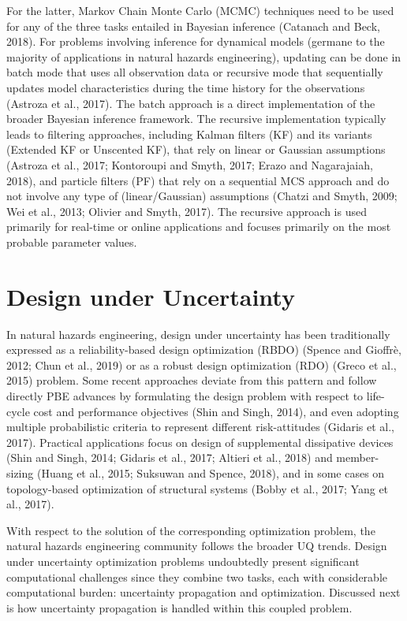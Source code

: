For the latter, Markov Chain Monte Carlo (MCMC) techniques need to be used for any of the three tasks entailed in Bayesian inference (Catanach and Beck, 2018). For problems involving inference for dynamical models (germane to the majority of applications in natural hazards engineering), updating can be done in batch mode that uses all observation data or recursive mode that sequentially updates model characteristics during the time history for the observations (Astroza et al., 2017). The batch approach is a direct implementation of the broader Bayesian inference framework. The recursive implementation typically leads to filtering approaches, including Kalman filters (KF) and its variants (Extended KF or Unscented KF), that rely on linear or Gaussian assumptions (Astroza et al., 2017; Kontoroupi and Smyth, 2017; Erazo and Nagarajaiah, 2018), and particle filters (PF) that rely on a sequential MCS approach and do not involve any type of (linear/Gaussian) assumptions (Chatzi and Smyth, 2009; Wei et al., 2013; Olivier and Smyth, 2017). The recursive approach is used primarily for real-time or online applications and focuses primarily on the most probable parameter values. 

\section{Design under Uncertainty}
\label{sec:uq_design}

In natural hazards engineering, design under uncertainty has been traditionally expressed as a reliability-based design optimization (RBDO) (Spence and Gioffrè, 2012; Chun et al., 2019) or as a robust design optimization (RDO) (Greco et al., 2015) problem. Some recent approaches deviate from this pattern and follow directly PBE advances by formulating the design problem with respect to life-cycle cost and performance objectives (Shin and Singh, 2014), and even adopting multiple probabilistic criteria to represent different risk-attitudes (Gidaris et al., 2017). Practical applications focus on design of supplemental dissipative devices (Shin and Singh, 2014; Gidaris et al., 2017; Altieri et al., 2018) and member-sizing (Huang et al., 2015; Suksuwan and Spence, 2018), and in some cases on topology-based optimization of structural systems (Bobby et al., 2017; Yang et al., 2017).

With respect to the solution of the corresponding optimization problem, the natural hazards engineering community follows the broader UQ trends. Design under uncertainty optimization problems undoubtedly present significant computational challenges since they combine two tasks, each with considerable computational burden: uncertainty propagation and optimization. Discussed next is how uncertainty propagation is handled within this coupled problem.

